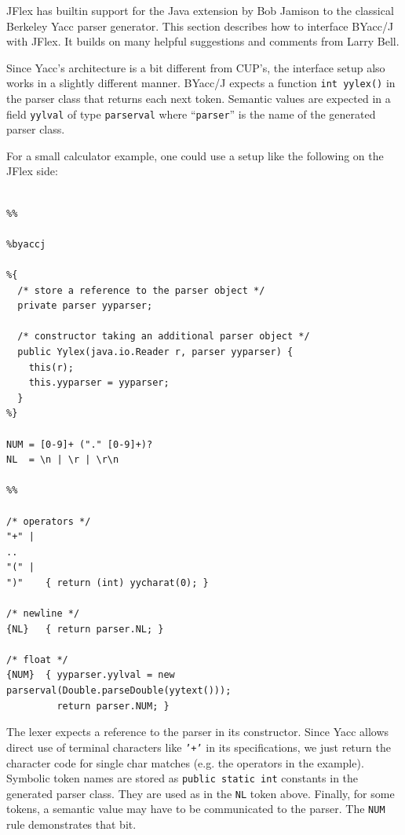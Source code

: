 \documentclass[11pt]{scrartcl}
\newcommand{\xsmall}{}
\begin{document}
JFlex has builtin support for the Java extension 
\cite{BYaccJ} by Bob Jamison
to the classical Berkeley Yacc parser generator.
This section describes how to interface BYacc/J with JFlex. It
builds on many helpful suggestions and comments from Larry Bell.

Since Yacc's architecture is a bit different from CUP's, the
interface setup also works in a slightly different manner.
BYacc/J expects a function \texttt{int yylex()} in the parser
class that returns each next token. Semantic values are expected
in a field \texttt{yylval} of type \texttt{parserval} where ``\texttt{parser}''
is the name of the generated parser class.

For a small calculator example, one could use a setup like the 
following on the JFlex side:

{\xsmall\begin{verbatim}

%%

%byaccj

%{
  /* store a reference to the parser object */
  private parser yyparser;

  /* constructor taking an additional parser object */
  public Yylex(java.io.Reader r, parser yyparser) {
    this(r);
    this.yyparser = yyparser;
  }
%}

NUM = [0-9]+ ("." [0-9]+)?
NL  = \n | \r | \r\n

%%

/* operators */
"+" | 
..
"(" | 
")"    { return (int) yycharat(0); }

/* newline */
{NL}   { return parser.NL; }

/* float */
{NUM}  { yyparser.yylval = new parserval(Double.parseDouble(yytext()));
         return parser.NUM; }
\end{verbatim}
}

The lexer expects a reference to the parser in its constructor.
Since Yacc allows direct use of terminal characters like \texttt{'+'}
in its specifications, we just return the character code for
single char matches (e.g. the operators in the example). Symbolic
token names are stored as \texttt{public static int} constants in
the generated parser class. They are used as in the \texttt{NL} token
above. Finally, for some tokens, a semantic value may have to be 
communicated to the parser. The \texttt{NUM} rule demonstrates that
bit.
\end{document}
